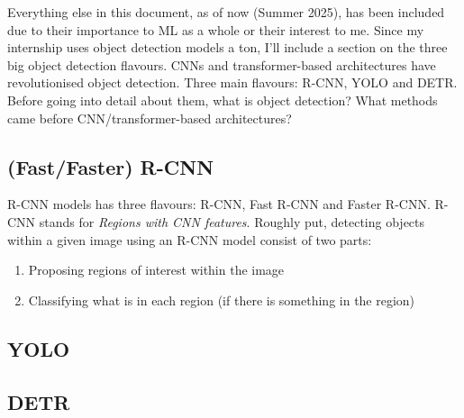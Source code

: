 \documentclass[11pt]{article}
\begin{document}
\TODO{} Everything else in this document, as of now (Summer 2025), has been included due to their importance to ML as a whole or their interest to me. Since my internship uses object detection models a ton, I'll include a section on the three big object detection flavours. CNNs and transformer-based architectures have revolutionised object detection. Three main flavours: R-CNN, YOLO and DETR. Before going into detail about them, what is object detection? What methods came before CNN/transformer-based architectures?

\subsection{(Fast/Faster) R-CNN}
\TODO{} R-CNN models has three flavours: R-CNN, Fast R-CNN and Faster R-CNN. R-CNN stands for \textit{Regions with CNN features}. Roughly put, detecting objects within a given image using an R-CNN model consist of two parts:
\begin{enumerate}
    \item Proposing regions of interest within the image
    \item Classifying what is in each region (if there is something in the region)
\end{enumerate}

\subsection{YOLO}
\TODO{}

\subsection{DETR}
\TODO{}
\end{document}
